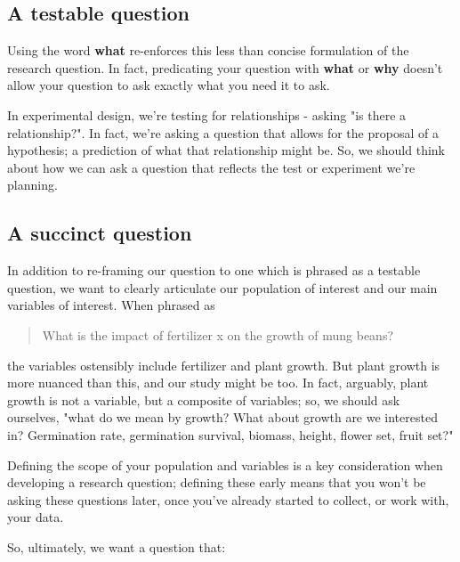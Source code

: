 \documentclass[
]{book}
\begin{document}
\hypertarget{a-testable-question}{%
\subsection*{A testable question}\label{a-testable-question}}

Using the word \textbf{what} re-enforces this less than concise formulation of the research question. In fact, predicating your question with \textbf{what} or \textbf{why} doesn't allow your question to ask exactly what you need it to ask.

In experimental design, we're testing for relationships - asking "is there a relationship?". In fact, we're asking a question that allows for the proposal of a hypothesis; a prediction of what that relationship might be. So, we should think about how we can ask a question that reflects the test or experiment we're planning.

\hypertarget{a-succinct-question}{%
\subsection*{A succinct question}\label{a-succinct-question}}

In addition to re-framing our question to one which is phrased as a testable question, we want to clearly articulate our population of interest and our main variables of interest. When phrased as

\begin{quote}
What is the impact of fertilizer x on the growth of mung beans?
\end{quote}

the variables ostensibly include fertilizer and plant growth. But plant growth is more nuanced than this, and our study might be too. In fact, arguably, plant growth is not a variable, but a composite of variables; so, we should ask ourselves, "what do we mean by growth? What about growth are we interested in? Germination rate, germination survival, biomass, height, flower set, fruit set?"

Defining the scope of your population and variables is a key consideration when developing a research question; defining these early means that you won't be asking these questions later, once you've already started to collect, or work with, your data.

So, ultimately, we want a question that:
\end{document}
